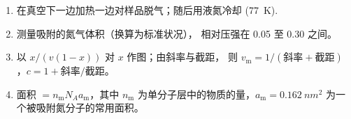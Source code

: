 \begin{method}[由氮气等温线测定比表面积]\label{met:b3:surfaces-catalysis:bet-area}
\begin{enumerate}
  \item 在真空下一边加热一边对样品脱气；随后用液氮冷却
        (\qty{77}{K}).
  \item 测量吸附的氮气体积（换算为标准状况），
        相对压强在 0.05 至 0.30 之间。
  \item 以 $x/(v(1 - x))$ 对 $x$ 作图；由斜率与截距，
        则 $v_{\mathrm m} = 1/(\text{斜率} + \text{截距})$，$c = 1 + \text{斜率}/\text{截距}$。
  \item 面积 $= n_{\mathrm m}N_Aa_{\mathrm m}$，其中 $n_{\mathrm m}$ 为单分子层中的物质的量，$a_{\mathrm m} = \qty{0.162}{nm^2}$
        为一个被吸附氮分子的常用面积。
\end{enumerate}
\end{method}

